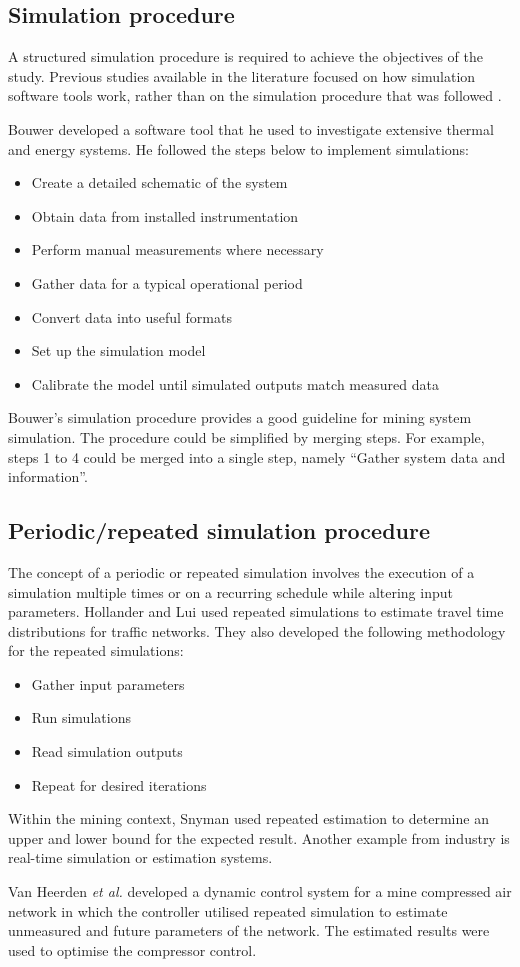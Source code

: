 	\subsection{Simulation procedure}
	A structured simulation procedure is required to achieve the objectives of the study. Previous studies available in the literature focused on how simulation software tools work, rather than on the simulation procedure that was followed \cite{Mare2016PhD}.
	\par
	Bouwer \cite{bouwer2004designing} developed a software tool that he used to investigate extensive thermal and energy systems. He followed the steps below to implement simulations:
	\begin{itemize}
		\item Create a detailed schematic of the system
		\item Obtain data from installed instrumentation
		\item Perform manual measurements where necessary
		\item Gather data for a typical operational period
		\item Convert data into useful formats
		\item Set up the simulation model
		\item Calibrate the model until simulated outputs match measured data
	\end{itemize}
	Bouwer's simulation procedure provides a good guideline for mining system simulation. The procedure could be simplified by merging steps. For example, steps 1 to 4 could be merged into a single step, namely \enquote{Gather system data and information}.
	\subsection{Periodic/repeated simulation procedure}
	The concept of a periodic or repeated simulation involves the execution of a simulation multiple times or on a recurring schedule while altering input parameters. Hollander and Lui \cite{Hollander2008Estimation} used repeated simulations to estimate travel time distributions for traffic networks. They also developed the following methodology for the repeated simulations:
	\begin{itemize}
		\item Gather input parameters
		\item Run simulations
		\item Read simulation outputs
		\item Repeat for desired iterations
	\end{itemize}
	\par
	 Within the mining context, Snyman \cite{Snyman2011Masters} used repeated estimation to determine an upper and lower bound for the expected result. Another example from industry is real-time simulation or estimation systems.
	\par 
	 Van Heerden \textit{et al.} \cite{van2014developing} developed a dynamic control system for a mine compressed air network in which the controller utilised repeated simulation to estimate unmeasured and future parameters of the network. The estimated results were used to optimise the compressor control.
	 \par
	
